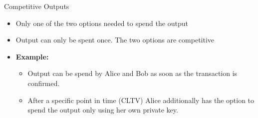 \documentclass[handout]{beamer}
\begin{document}
\begin{frame}{Competitive Outputs}
\begin{minipage}{0.3\textwidth}
\begin{figure}
		\end{figure}
	\end{minipage}%
	\hfill
	\begin{minipage}{0.6\textwidth}
		\begin{itemize}
			\item<1-> Only one of the two options needed to spend the output
			\item<2-> Output can only be spent once. The two options are competitive
			\vspace{0.25cm}
			\item<3-> \textbf{Example:}
			\begin{itemize}
				\item<3-> Output can be spend by Alice and Bob as soon as the transaction is confirmed.
				\item<4-> After a specific point in time (CLTV) Alice additionally has the option to spend the output only using her own private key.
			\end{itemize}
		\end{itemize}
	\end{minipage}
\end{frame}

\end{document}
